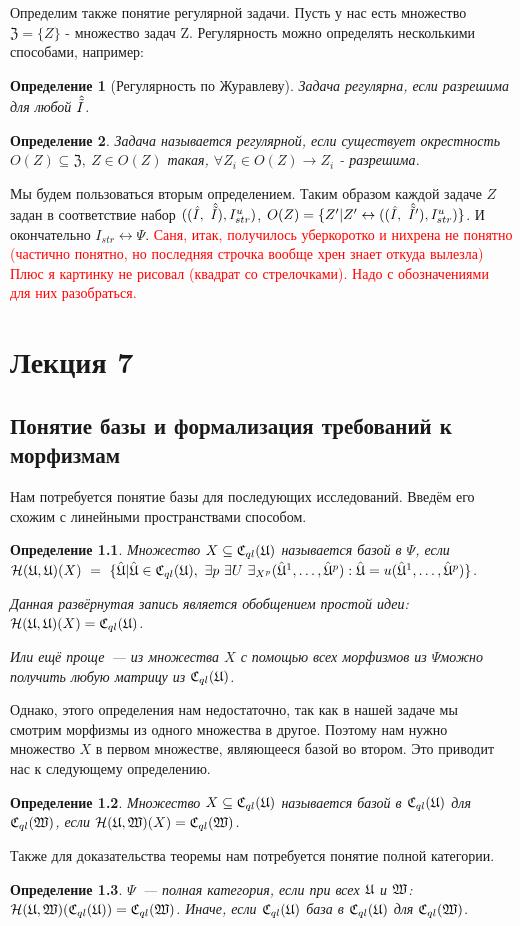\documentclass[a4paper, 12pt]{report}
\newtheorem{definition}{Определение}[chapter]
\begin{document}
Определим также понятие регулярной задачи. Пусть у нас есть множество $\mathfrak{Z}=\{Z\}$ - множество задач Z. Регулярность можно определять несколькими способами, например:
\begin{definition}[Регулярность по Журавлеву]
Задача регулярна, если разрешима для любой $\hat{\tilde{I}}$.
\end{definition}
\begin{definition}
Задача называется регулярной, если существует окрестность $O(Z)\subseteq \mathfrak{Z},\ Z\in O(Z)$ такая, $\forall Z_i\in O(Z) \rightarrow Z_i$ - разрешима.
\end{definition}
Мы будем пользоваться вторым определением.
Таким образом каждой задаче $Z$ задан в соответствие набор $((\hat{I},\ \hat{\tilde{I}}), I_{str}^u)$, $O(Z) = \{Z'| Z' \leftrightarrow ((\hat{I},\ \hat{\tilde{I}}'), I_{str}^u)\}$.
И окончательно $I_{str} \leftrightarrow \Psi$.
\textcolor{red}{Саня, итак, получилось уберкоротко и нихрена не понятно (частично понятно, но последняя строчка вообще хрен знает откуда вылезла) Плюс я картинку не рисовал (квадрат со стрелочками). Надо с обозначениями для них разобраться.}

\chapter{Лекция 7}
\section{Понятие базы и формализация требований к морфизмам}
Нам потребуется понятие базы для последующих исследований. Введём его схожим с линейными пространствами способом.
\begin{definition}
Множество $X\subseteq \mathfrak{C}_{ql}(\mathfrak{U})$ называется базой в $\Psi$, если $\mathcal{H}(\mathfrak{U},\mathfrak{U})(X)\ =\ \{\hat{\mathfrak{U}}| \hat{\mathfrak{U}} \in \mathfrak{C}_{ql}(\mathfrak{U}),\ \exists p\ \exists U\ \exists_{X^p} (\hat{\mathfrak{U}}^1,\ldots,\hat{\mathfrak{U}}^p): \hat{\mathfrak{U}} = u(\hat{\mathfrak{U}}^1,\ldots,\hat{\mathfrak{U}}^p)\}$.

Данная развёрнутая запись является обобщением простой идеи:  $\mathcal{H}(\mathfrak{U},\mathfrak{U})(X) = \mathfrak{C}_{ql}(\mathfrak{U})$.

Или ещё проще~--- из множества $X$ с помощью всех морфизмов из $\Psi $можно получить любую матрицу из $\mathfrak{C}_{ql}(\mathfrak{U})$.
\end{definition}
Однако, этого определения нам недостаточно, так как в нашей задаче мы смотрим морфизмы из одного множества в другое. Поэтому нам нужно множество $X$ в первом множестве, являющееся базой во втором. Это приводит нас к следующему определению.
\begin{definition}
Множество $X\subseteq \mathfrak{C}_{ql}(\mathfrak{U})$ называется базой в $\mathfrak{C}_{ql}(\mathfrak{U})$ для $\mathfrak{C}_{ql}(\mathfrak{W})$, если $\mathcal{H}(\mathfrak{U},\mathfrak{W})(X) = \mathfrak{C}_{ql}(\mathfrak{W})$.
\end{definition}
Также для доказательства теоремы нам потребуется понятие полной категории.
\begin{definition}
$\Psi$~--- полная категория, если при всех $\mathfrak{U}$ и  $\mathfrak{W}$: $\mathcal{H}(\mathfrak{U},\mathfrak{W})(\mathfrak{C}_{ql}(\mathfrak{U})) = \mathfrak{C}_{ql}(\mathfrak{W})$. Иначе, если $\mathfrak{C}_{ql}(\mathfrak{U})$ база в $\mathfrak{C}_{ql}(\mathfrak{U})$ для $\mathfrak{C}_{ql}(\mathfrak{W})$.
\end{definition}
\end{document}
